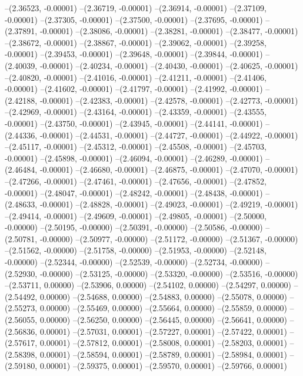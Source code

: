 --(2.36523, -0.00001)
--(2.36719, -0.00001)
--(2.36914, -0.00001)
--(2.37109, -0.00001)
--(2.37305, -0.00001)
--(2.37500, -0.00001)
--(2.37695, -0.00001)
--(2.37891, -0.00001)
--(2.38086, -0.00001)
--(2.38281, -0.00001)
--(2.38477, -0.00001)
--(2.38672, -0.00001)
--(2.38867, -0.00001)
--(2.39062, -0.00001)
--(2.39258, -0.00001)
--(2.39453, -0.00001)
--(2.39648, -0.00001)
--(2.39844, -0.00001)
--(2.40039, -0.00001)
--(2.40234, -0.00001)
--(2.40430, -0.00001)
--(2.40625, -0.00001)
--(2.40820, -0.00001)
--(2.41016, -0.00001)
--(2.41211, -0.00001)
--(2.41406, -0.00001)
--(2.41602, -0.00001)
--(2.41797, -0.00001)
--(2.41992, -0.00001)
--(2.42188, -0.00001)
--(2.42383, -0.00001)
--(2.42578, -0.00001)
--(2.42773, -0.00001)
--(2.42969, -0.00001)
--(2.43164, -0.00001)
--(2.43359, -0.00001)
--(2.43555, -0.00001)
--(2.43750, -0.00001)
--(2.43945, -0.00001)
--(2.44141, -0.00001)
--(2.44336, -0.00001)
--(2.44531, -0.00001)
--(2.44727, -0.00001)
--(2.44922, -0.00001)
--(2.45117, -0.00001)
--(2.45312, -0.00001)
--(2.45508, -0.00001)
--(2.45703, -0.00001)
--(2.45898, -0.00001)
--(2.46094, -0.00001)
--(2.46289, -0.00001)
--(2.46484, -0.00001)
--(2.46680, -0.00001)
--(2.46875, -0.00001)
--(2.47070, -0.00001)
--(2.47266, -0.00001)
--(2.47461, -0.00001)
--(2.47656, -0.00001)
--(2.47852, -0.00001)
--(2.48047, -0.00001)
--(2.48242, -0.00001)
--(2.48438, -0.00001)
--(2.48633, -0.00001)
--(2.48828, -0.00001)
--(2.49023, -0.00001)
--(2.49219, -0.00001)
--(2.49414, -0.00001)
--(2.49609, -0.00001)
--(2.49805, -0.00001)
--(2.50000, -0.00000)
--(2.50195, -0.00000)
--(2.50391, -0.00000)
--(2.50586, -0.00000)
--(2.50781, -0.00000)
--(2.50977, -0.00000)
--(2.51172, -0.00000)
--(2.51367, -0.00000)
--(2.51562, -0.00000)
--(2.51758, -0.00000)
--(2.51953, -0.00000)
--(2.52148, -0.00000)
--(2.52344, -0.00000)
--(2.52539, -0.00000)
--(2.52734, -0.00000)
--(2.52930, -0.00000)
--(2.53125, -0.00000)
--(2.53320, -0.00000)
--(2.53516, -0.00000)
--(2.53711, 0.00000)
--(2.53906, 0.00000)
--(2.54102, 0.00000)
--(2.54297, 0.00000)
--(2.54492, 0.00000)
--(2.54688, 0.00000)
--(2.54883, 0.00000)
--(2.55078, 0.00000)
--(2.55273, 0.00000)
--(2.55469, 0.00000)
--(2.55664, 0.00000)
--(2.55859, 0.00000)
--(2.56055, 0.00000)
--(2.56250, 0.00000)
--(2.56445, 0.00000)
--(2.56641, 0.00000)
--(2.56836, 0.00001)
--(2.57031, 0.00001)
--(2.57227, 0.00001)
--(2.57422, 0.00001)
--(2.57617, 0.00001)
--(2.57812, 0.00001)
--(2.58008, 0.00001)
--(2.58203, 0.00001)
--(2.58398, 0.00001)
--(2.58594, 0.00001)
--(2.58789, 0.00001)
--(2.58984, 0.00001)
--(2.59180, 0.00001)
--(2.59375, 0.00001)
--(2.59570, 0.00001)
--(2.59766, 0.00001)

